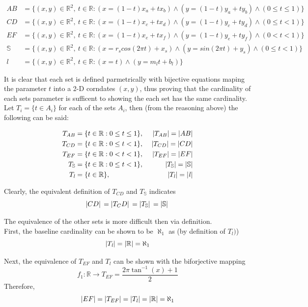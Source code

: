\documentclass[]{article}
\newcommand{\R}{\mathbb{R}}
\begin{document}
\begin{align*}
	AB &= \{(x,y) \in \R^2, \ t \in \R : 
	(x = (1-t) x_a + t x_b) \land (y = (1-t) y_a + t y_b)
	\land (0 \leq t \leq 1)\}\\
	CD &= \{(x,y) \in \R^2, \ t \in \R : 
	(x = (1-t) x_c + t x_d) \land (y = (1-t) y_c + t y_d)
	\land (0 \leq t < 1)\}\\
	EF &= \{(x,y) \in \R^2, \ t \in \R : 
	(x = (1-t) x_e + t x_f) \land (y = (1-t) y_e + t y_f)
	\land (0 < t < 1)\}\\
	\mathbb{S} &= \{(x,y) \in \R^2, \ t \in \R : 
	(x = r_s cos(2 \pi t) + x_s) \land (y = sin(2 \pi t) + y_s)
	\land (0 \leq t < 1)\}\\
	\mathit{l} &= \{(x,y) \in \R^2, \ t \in \R: (x = t) \land (y = m_l t + b_l)\}
\end{align*}

It is clear that each set is defined parmetrically with bijective equations maping 
the parameter $t$ into a 2-D corndates $(x,y)$, thus proving that the cardinality 
of each sets parameter is sufficent to showing the each set has the same cardinality.\\

Let $T_i = \{t \in A_i\}$ for each of the sets $A_i$, then (from the reasoning above) 
the following can be said:

\begin{align*}
	T_{AB} &= \{t \in \R : 0 \leq t \leq 1\}, \ &\abs{T_{AB}} = \abs{AB}\\
	T_{CD} &= \{t \in \R : 0 \leq t < 1\}, \ &\abs{T_{CD}} = \abs{CD}\\
	T_{EF} &= \{t \in \R : 0 < t < 1\}, \ &\abs{T_{EF}} = \abs{EF}\\
	T_{\mathbb{S}} &= \{t \in \R : 0 \leq t < 1\}, \ &\abs{T_{\mathbb{S}}} = \abs{\mathbb{S}}\\
	T_{\mathit{l}} &= \{t \in \R\}, \ &\abs{T_{\mathit{l}}} = \abs{\mathit{l}}\\
\end{align*}

Clearly, the equivalent definition of $T_{CD}$ and $T_{\mathbb{S}}$ indicates
$$\abs*{CD} = \abs*{T_CD} = \abs*{T_\mathbb{S}} = \abs*{\mathbb{S}}$$

The equivalence of the other sets is more difficult then via definition.\\
First, the baseline cardinality can be shown to be $\aleph_1$ as (by definition of $T_{\mathit{l}})$)
$$\abs{T_\mathit{l}} = \abs{\R} = \aleph_1$$

Next, the equivalence of $T_{EF}$ and $T_\mathit{l}$ can be shown with the biforjective mapping 
$$f_1 : \R \rightarrow T_{EF} = \frac{2 \pi \tan^{-1}(x) + 1}{2}$$
Therefore,
$$\abs{EF} = \abs{T_{EF}} = \abs{T_{\mathit{l}}} = \abs{\R} = \aleph_1$$
\end{document}
